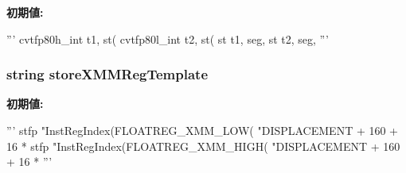\label{namespaceinsts_1_1simd128_1_1integer_1_1save__and__restore__state_1_1save__and__restore__state_a01cd3787b709e78724b65b609760b5ac}
{\bfseries 初期値:}
\begin{DoxyCode}
'''
    cvtfp80h_int t1, st(%
    cvtfp80l_int t2, st(%
    st t1, seg, %
    st t2, seg, %
'''
\end{DoxyCode}
\hypertarget{namespaceinsts_1_1simd128_1_1integer_1_1save__and__restore__state_1_1save__and__restore__state_a699e17f830f92abd44d0036d0c5338b0}{
\subsubsection[{storeXMMRegTemplate}]{\setlength{\rightskip}{0pt plus 5cm}string {\bf storeXMMRegTemplate}}}
\label{namespaceinsts_1_1simd128_1_1integer_1_1save__and__restore__state_1_1save__and__restore__state_a699e17f830f92abd44d0036d0c5338b0}
{\bfseries 初期値:}
\begin{DoxyCode}
'''
    stfp "InstRegIndex(FLOATREG_XMM_LOW(%
         "DISPLACEMENT + 160 + 16 * %
    stfp "InstRegIndex(FLOATREG_XMM_HIGH(%
         "DISPLACEMENT + 160 + 16 * %
'''
\end{DoxyCode}
